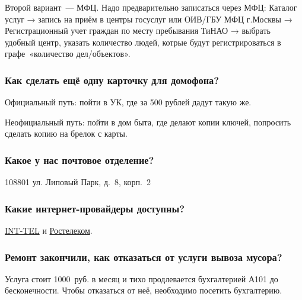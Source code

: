 \documentclass[10pt,landscape,a4paper]{article}
\begin{document}
\begin{multicols*}{3}
  Второй вариант~--- МФЦ. Надо предварительно записаться через МФЦ: Каталог услуг → запись на приём в центры госуслуг или ОИВ/ГБУ МФЦ
  г.Москвы → Регистрационный учет граждан по месту пребывания ТиНАО → выбрать удобный центр, указать количество людей, котрые будут
  регистрироваться в графе «количество дел/объектов».

  \subsubsection*{Как сделать ещё одну карточку для домофона?}
  Официальный путь: пойти в УК, где за 500 рублей дадут такую же.

  Неофициальный путь: пойти в дом быта, где делают копии ключей, попросить сделать копию на брелок с карты.

  \subsubsection*{Какое у нас почтовое отделение?}

  108801 ул. Липовый Парк, д.~8, корп.~2

  \subsubsection*{Какие интернет-провайдеры доступны?}

  \href{http://int-tel.net/}{INT-TEL} и \href{https://moscow.rt.ru/}{Ростелеком}.

  \subsubsection*{Ремонт закончили, как отказаться от услуги вывоза мусора?}

  Услуга стоит 1000~руб. в месяц и тихо продлевается бухгалтерией А101 до бесконечности. Чтобы отказаться от неё, необходимо посетить
  бухгалтерию.

\end{multicols*}
\end{document}

